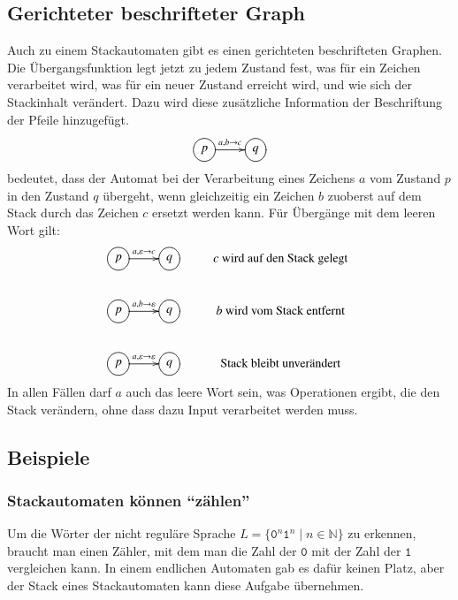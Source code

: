 \subsection{Gerichteter beschrifteter Graph}
%
Auch zu einem Stackautomaten gibt es einen gerichteten beschrifteten
Graphen.
Die Übergangsfunktion legt jetzt zu jedem Zustand 
fest, was für ein Zeichen verarbeitet wird, was für ein
neuer Zustand erreicht wird, und wie sich der Stackinhalt
verändert.
Dazu wird diese zusätzliche Information der Beschriftung der Pfeile
hinzugefügt.
\[
\xymatrix{
*++[o][F]{p}\ar[r]^{a,b\to c}
	&*++[o][F]{q}
}
\]
bedeutet, dass der Automat bei der Verarbeitung eines Zeichens $a$
vom Zustand $p$ in den Zustand $q$ übergeht, wenn gleichzeitig
ein Zeichen $b$ zuoberst auf dem Stack durch das Zeichen $c$
ersetzt werden kann.
Für Übergänge mit dem leeren Wort gilt:
\[
\xymatrix{
*++[o][F]{p}\ar[r]^{a,\varepsilon\to c}
	&*++[o][F]{q}
		&\text{$c$ wird auf den Stack gelegt}
\\
*++[o][F]{p}\ar[r]^{a,b\to\varepsilon}
	&*++[o][F]{q}
		&\text{$b$ wird vom Stack entfernt}
\\
*++[o][F]{p}\ar[r]^{a,\varepsilon\to\varepsilon}
	&*++[o][F]{q}
		&\text{Stack bleibt unverändert}
}
\]
In allen Fällen darf $a$ auch das leere Wort sein, was Operationen
ergibt, die den Stack verändern, ohne dass dazu Input verarbeitet werden
muss.


\subsection{Beispiele\label{stackbeispiele}}
\subsubsection{Stackautomaten können ``zählen''}
Um die Wörter der nicht reguläre Sprache
$L=\{\texttt{0}^n\texttt{1}^n\;|\;n\in \mathbb N\}$
zu erkennen, braucht man einen Zähler, mit dem man die Zahl der $\texttt{0}$
mit der Zahl der $\texttt{1}$ vergleichen kann.
In einem endlichen Automaten
gab es dafür keinen Platz, aber der Stack eines Stackautomaten kann
diese Aufgabe übernehmen.

